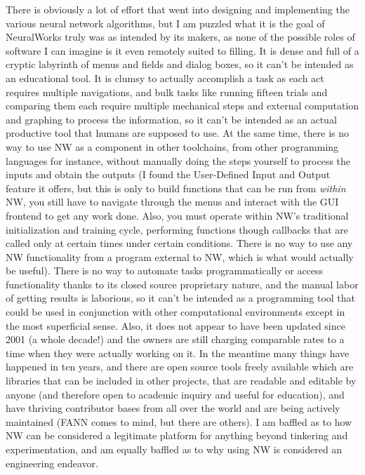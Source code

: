 \documentclass[12pt]{article}
\begin{document}
There is obviously a lot of effort that went into designing and implementing the various neural network algorithms, but I am puzzled what it is the goal of NeuralWorks truly was as intended by its makers, as none of the possible roles of software I can imagine is it even remotely suited to filling.  It is dense and full of a cryptic labyrinth of menus and fields and dialog boxes, so it can't be intended as an educational tool.  It is clumsy to actually accomplish a task as each act requires multiple navigations, and bulk tasks like running fifteen trials and comparing them each require multiple mechanical steps and external computation and graphing to process the information, so it can't be intended as an actual productive tool that humans are supposed to use.  At the same time, there is no way to use NW as a component in other toolchains, from other programming languages for instance, without manually doing the steps yourself to process the inputs and obtain the outputs (I found the User-Defined Input and Output feature it offers, but this is only to build functions that can be run from \emph{within} NW, you still have to navigate through the menus and interact with the GUI frontend to get any work done.  Also, you must operate within NW's traditional initialization and training cycle, performing functions though callbacks that are called only at certain times under certain conditions.  There is no way to use any NW functionality from a program external to NW, which is what would actually be useful).  There is no way to automate tasks programmatically or access functionality thanks to its closed source proprietary nature, and the manual labor of getting results is laborious, so it can't be intended as a programming tool that could be used in conjunction with other computational environments except in the most superficial sense.  Also, it does not appear to have been updated since 2001 (a whole decade!) and the owners are still charging comparable rates to a time when they were actually working on it.  In the meantime many things have happened in ten years, and there are open source tools freely available which are libraries that can be included in other projects, that are readable and editable by anyone (and therefore open to academic inquiry and useful for education), and have thriving contributor bases from all over the world and are being actively maintained (FANN comes to mind, but there are others).  I am baffled as to how NW can be considered a legitimate platform for anything beyond tinkering and experimentation, and am equally baffled as to why using NW is considered an engineering endeavor.  
\end{document}
